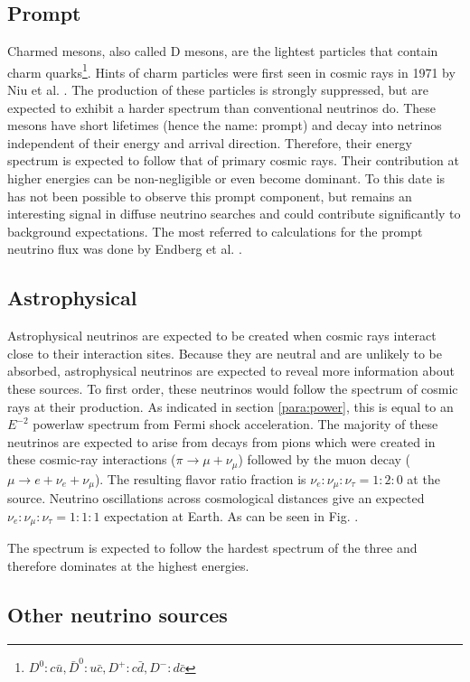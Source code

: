 \subsection{Prompt}
Charmed mesons, also called D mesons, are the lightest particles that contain charm quarks\footnote{$D^0: c\bar{u}, \bar{D}^0: u\bar{c}, D^+: c\bar{d}, D^-: d\bar{c}$}. Hints of charm particles were first seen in cosmic rays in 1971 by Niu et al. \cite{doi:10.1143/PTP.46.1644}. The production of these particles is strongly suppressed, but are expected to exhibit a harder spectrum than conventional neutrinos do. These mesons have short lifetimes (hence the name: prompt) and decay into netrinos independent of their energy and arrival direction. Therefore, their energy spectrum is expected to follow that of primary cosmic rays. Their contribution at higher energies can be non-negligible or even become dominant. To this date is has not been possible to observe this prompt component, but remains an interesting signal in diffuse neutrino searches and could contribute significantly to background expectations.  The most referred to calculations for the prompt neutrino flux was done by Endberg et al. \cite{Enberg:2008te}.
\subsection{Astrophysical}
\label{subsec:astro}
Astrophysical neutrinos are expected to be created when cosmic rays interact close to their interaction sites. Because they are neutral and are unlikely to be absorbed, astrophysical neutrinos are expected to reveal more information about these sources. To first order, these neutrinos would follow the spectrum of cosmic rays at their production. As indicated in section \ref{para:power}, this is equal to an $E^{-2}$ powerlaw spectrum from Fermi shock acceleration. The majority of these neutrinos are expected to arise from decays from pions which were created in these cosmic-ray interactions ($\pi \rightarrow \mu + \nu_\mu$) followed by the muon decay ($\mu \rightarrow e + \nu_e + \nu_\mu$). The resulting flavor ratio fraction is $\nu_e: \nu_\mu: \nu_\tau = 1:2:0$ at the source. Neutrino oscillations across cosmological distances give an expected $\nu_e: \nu_\mu: \nu_\tau = 1:1:1$ expectation at Earth. As can be seen in Fig. \cite{fig:neutrinospectrum2}.

The spectrum is expected to follow the hardest spectrum of the three and therefore dominates at the highest energies.

\subsection{Other neutrino sources}
